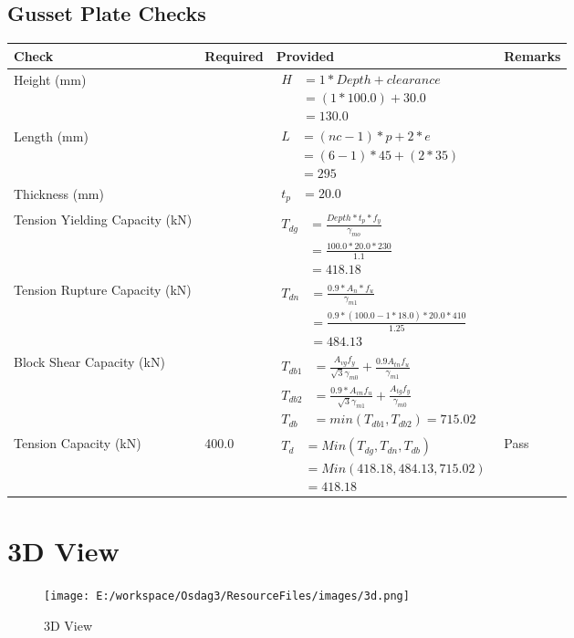 \documentclass{article}%
\begin{document}
\subsection{Gusset Plate Checks}%
\label{subsec:GussetPlateChecks}%
\renewcommand{\arraystretch}{1.2}%
\begin{longtable}{|p{2.5cm}|p{5cm}|p{7.5cm}|p{1cm}|}%
\hline%
\rowcolor{OsdagGreen}%
Check&Required&Provided&Remarks\\%
\hline%
\endhead%
\hline%
Height (mm)&&$\begin{aligned} H &= 1* Depth + clearance \\ &=(1*100.0)+30.0\\ &= 130.0\end{aligned}$&\\%
\hline%
Length (mm)&&$\begin{aligned} L &= (nc -1) * p + 2 * e\\ &= (6-1) *45+ (2 *35)\\ &= 295\end{aligned}$&\\%
\hline%
Thickness (mm)&&$\begin{aligned} t_p &=20.0 \end{aligned}$&\\%
\hline%
Tension Yielding Capacity (kN)&&$\begin{aligned} T_{dg} &= \frac{Depth*t_p*f_y}{\gamma_{mo}}\\ &=\frac{100.0*20.0*230}{1.1}\\ &=418.18\end{aligned}$&\\%
\hline%
Tension Rupture Capacity (kN)&&$\begin{aligned} T_{dn} &= \frac{0.9*A_{n}*f_u}{\gamma_{m1}}\\ &=\frac{0.9*(100.0-1*18.0)*20.0*410}{1.25}\\ &=484.13\end{aligned}$&\\%
\hline%
Block Shear Capacity (kN)&&$\begin{aligned}T_{db1} &= \frac{A_{vg} f_{y}}{\sqrt{3} \gamma_{m0}} + \frac{0.9 A_{tn} f_{u}}{\gamma_{m1}}\\ T_{db2} &= \frac{0.9*A_{vn} f_{u}}{\sqrt{3} \gamma_{m1}} + \frac{A_{tg} f_{y}}{\gamma_{m0}}\\ T_{db} &= min(T_{db1}, T_{db2})= 715.02\end{aligned}$&\\%
\hline%
Tension Capacity (kN)&400.0&$\begin{aligned} T_d &= Min(T_{dg},T_{dn},T_{db})\\ &= Min(418.18,484.13,715.02)\\ &=418.18\end{aligned}$&Pass\\%
\hline%
\end{longtable}

%
%
\newpage%
\section{3D View}%
\label{sec:3DView}%


\begin{figure}[h!]%
\centering%
\texttt{[image: E:/workspace/Osdag3/ResourceFiles/images/3d.png]}%
\caption{3D View}%
\end{figure}

%
\end{document}
